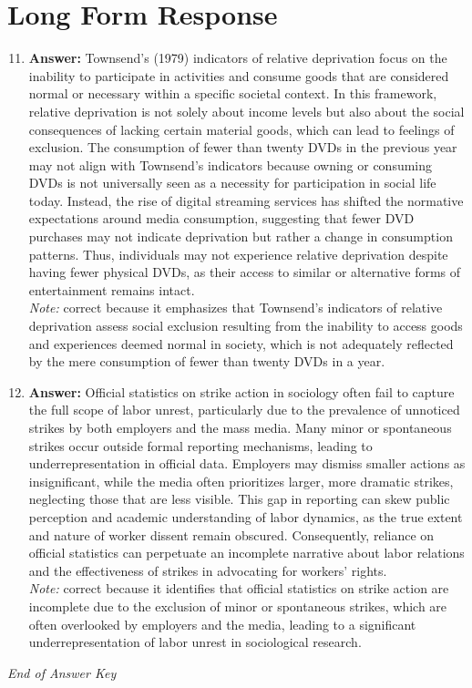 \documentclass[12pt]{article}
\begin{document}
\section*{Long Form Response}
\begin{enumerate}[label=\arabic*.]
\setcounter{enumi}{10}
\item \textbf{Answer:} Townsend's (1979) indicators of relative deprivation focus on the inability to participate in activities and consume goods that are considered normal or necessary within a specific societal context. In this framework, relative deprivation is not solely about income levels but also about the social consequences of lacking certain material goods, which can lead to feelings of exclusion. The consumption of fewer than twenty DVDs in the previous year may not align with Townsend's indicators because owning or consuming DVDs is not universally seen as a necessity for participation in social life today. Instead, the rise of digital streaming services has shifted the normative expectations around media consumption, suggesting that fewer DVD purchases may not indicate deprivation but rather a change in consumption patterns. Thus, individuals may not experience relative deprivation despite having fewer physical DVDs, as their access to similar or alternative forms of entertainment remains intact.
\\ \textit{Note:} correct because it emphasizes that Townsend's indicators of relative deprivation assess social exclusion resulting from the inability to access goods and experiences deemed normal in society, which is not adequately reflected by the mere consumption of fewer than twenty DVDs in a year.
\item \textbf{Answer:} Official statistics on strike action in sociology often fail to capture the full scope of labor unrest, particularly due to the prevalence of unnoticed strikes by both employers and the mass media. Many minor or spontaneous strikes occur outside formal reporting mechanisms, leading to underrepresentation in official data. Employers may dismiss smaller actions as insignificant, while the media often prioritizes larger, more dramatic strikes, neglecting those that are less visible. This gap in reporting can skew public perception and academic understanding of labor dynamics, as the true extent and nature of worker dissent remain obscured. Consequently, reliance on official statistics can perpetuate an incomplete narrative about labor relations and the effectiveness of strikes in advocating for workers' rights.
\\ \textit{Note:} correct because it identifies that official statistics on strike action are incomplete due to the exclusion of minor or spontaneous strikes, which are often overlooked by employers and the media, leading to a significant underrepresentation of labor unrest in sociological research.
\end{enumerate}

\vfill
\noindent\textit{End of Answer Key}
\end{document}
